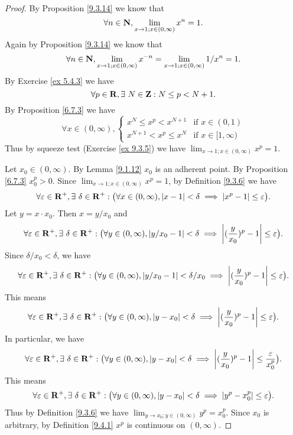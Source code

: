 \begin{proof}
    By Proposition \ref{9.3.14} we know that
    \[
        \forall n \in \mathbf{N}, \lim_{x \to 1 ; x \in (0, \infty)} x^n = 1.
    \]
    Again by Proposition \ref{9.3.14} we know that
    \[
        \forall n \in \mathbf{N}, \lim_{x \to 1 ; x \in (0, \infty)} x^{-n} = \lim_{x \to 1 ; x \in (0, \infty)} 1 / x^n = 1.
    \]
    By Exercise \ref{ex 5.4.3} we have
    \[
        \forall p \in \mathbf{R}, \exists\ N \in \mathbf{Z} : N \leq p < N + 1.
    \]
    By Proposition \ref{6.7.3} we have
    \[
        \forall x \in (0, \infty), \begin{cases}
            x^N \leq x^p < x^{N + 1}   & \text{if } x \in (0, 1)      \\
            x^{N + 1} < x^p \leq x^{N} & \text{if } x \in [1, \infty)
        \end{cases}
    \]
    Thus by squeeze test (Exercise \ref{ex 9.3.5}) we have \(\lim_{x \to 1 ; x \in (0, \infty)} x^p = 1\).

    Let \(x_0 \in (0, \infty)\).
    By Lemma \ref{9.1.12} \(x_0\) is an adherent point.
    By Proposition \ref{6.7.3} \(x_0^p > 0\).
    Since \(\lim_{x \to 1 ; x \in (0, \infty)} x^p = 1\), by Definition \ref{9.3.6} we have
    \[
        \forall \varepsilon \in \mathbf{R}^+, \exists\ \delta \in \mathbf{R}^+ : \big(\forall x \in (0, \infty), \left\lvert x - 1\right\rvert < \delta \implies \left\lvert x^p - 1\right\rvert \leq \varepsilon\big).
    \]
    Let \(y = x \cdot x_0\).
    Then \(x = y / x_0\) and
    \[
        \forall \varepsilon \in \R^+, \exists\ \delta \in \R^+ : \big(\forall y \in (0, \infty), \abs{y / x_0 - 1} < \delta \implies \abs{(\frac{y}{x_0})^p - 1} \leq \varepsilon\big).
    \]
    Since \(\delta / x_0 < \delta\), we have
    \[
        \forall \varepsilon \in \mathbf{R}^+, \exists\ \delta \in \mathbf{R}^+ : \big(\forall y \in (0, \infty), \left\lvert y / x_0 - 1\right\rvert < \delta / x_0 \implies \left\lvert(\frac{y}{x_0})^p - 1\right\rvert \leq \varepsilon\big).
    \]
    This means
    \[
        \forall \varepsilon \in \mathbf{R}^+, \exists\ \delta \in \mathbf{R}^+ : \big(\forall y \in (0, \infty), \left\lvert y - x_0\right\rvert < \delta \implies \left\lvert(\frac{y}{x_0})^p - 1\right\rvert \leq \varepsilon\big).
    \]
    In particular, we have
    \[
        \forall \varepsilon \in \mathbf{R}^+, \exists\ \delta \in \mathbf{R}^+ : \big(\forall y \in (0, \infty), \left\lvert y - x_0\right\rvert < \delta \implies \left\lvert(\frac{y}{x_0})^p - 1\right\rvert \leq \frac{\varepsilon}{x_0^p}\big).
    \]
    This means
    \[
        \forall \varepsilon \in \mathbf{R}^+, \exists\ \delta \in \mathbf{R}^+ : \big(\forall y \in (0, \infty), \left\lvert y - x_0\right\rvert < \delta \implies \left\lvert y^p - x_0^p\right\rvert \leq \varepsilon\big).
    \]
    Thus by Definition \ref{9.3.6} we have \(\lim_{y \to x_0 ; y \in (0, \infty)} y^p = x_0^p\).
    Since \(x_0\) is arbitrary, by Definition \ref{9.4.1} \(x^p\) is continuous on \((0, \infty)\).
\end{proof}

